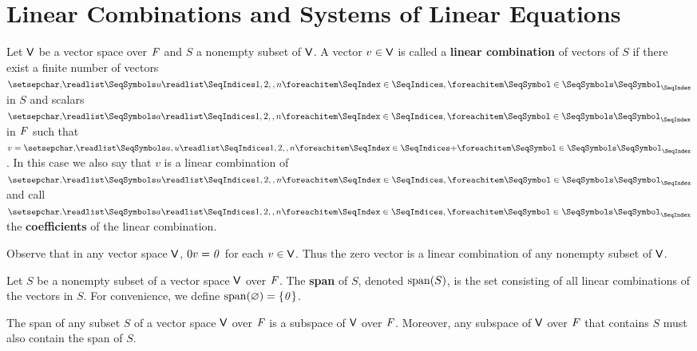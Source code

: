 \section{Linear Combinations and Systems of Linear Equations}\label{sec:1.4}

\begin{defn}\label{1.4.1}
  Let \(\mathsf{V}\) be a vector space over \(\mathit{F}\) and \(S\) a nonempty subset of \(\mathsf{V}\).
  A vector \(v \in \mathsf{V}\) is called a \textbf{linear combination} of vectors of \(S\) if there exist a finite number of vectors \(\seq{u}{1,2,,n}\) in \(S\) and scalars \(\seq{a}{1,2,,n}\) in \(\mathit{F}\) such that \(v = \seq[+]{a,u}{1,2,,n}\).
  In this case we also say that \(v\) is a linear combination of \(\seq{u}{1,2,,n}\) and call \(\seq{a}{1,2,,n}\) the \textbf{coefficients} of the linear combination.
\end{defn}

\begin{eg}\label{1.4.2}
  Observe that in any vector space \(\mathsf{V}\), \(0v = \mathit{0}\) for each \(v \in \mathsf{V}\).
  Thus the zero vector is a linear combination of any nonempty subset of \(\mathsf{V}\).
\end{eg}

\begin{defn}\label{1.4.3}
  Let \(S\) be a nonempty subset of a vector space \(\mathsf{V}\) over \(\mathit{F}\).
  The \textbf{span} of \(S\), denoted \(\spn{S}\), is the set consisting of all linear combinations of the vectors in \(S\).
  For convenience, we define \(\spn{\varnothing} = \set{\zv}\).
\end{defn}

\begin{thm}\label{1.5}
  The span of any subset \(S\) of a vector space \(\mathsf{V}\) over \(\mathit{F}\) is a subspace of \(\mathsf{V}\) over \(\mathit{F}\).
  Moreover, any subspace of \(\mathsf{V}\) over \(\mathit{F}\) that contains \(S\) must also contain the span of \(S\).
\end{thm}

